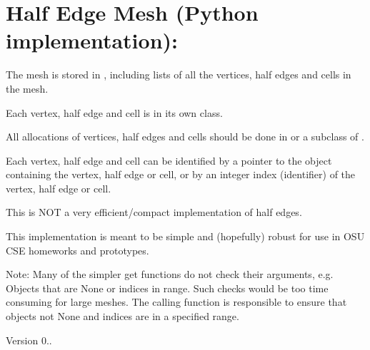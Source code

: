 \chapter{Half Edge Mesh (Python implementation)\+:}
\hypertarget{index}{}\label{index}
The mesh is stored in , including lists of all the vertices, half edges and cells in the mesh.
\begin{DoxyItemize}
\item Each vertex, half edge and cell is in its own class.
\item All allocations of vertices, half edges and cells should be done in  or a subclass of .
\item Each vertex, half edge and cell can be identified by a pointer to the object containing the vertex, half edge or cell, or by an integer index (identifier) of the vertex, half edge or cell.
\item This is NOT a very efficient/compact implementation of half edges.
\item This implementation is meant to be simple and (hopefully) robust for use in OSU CSE homeworks and prototypes.
\item Note\+: Many of the simpler get functions do not check their arguments, e.\+g. Objects that are None or indices in range. Such checks would be too time consuming for large meshes. The calling function is responsible to ensure that objects not None and indices are in a specified range.
\item Version 0.. 
\end{DoxyItemize}